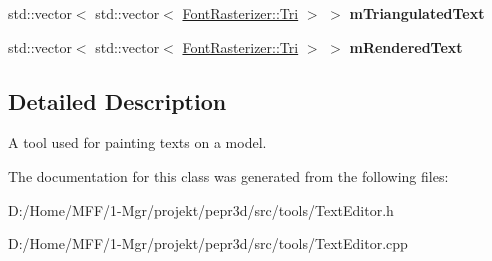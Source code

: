 \begin{DoxyCompactItemize}
\mbox{\label{classpepr3d_1_1_text_editor_a84883561e33acc9e2bdf227823cbe505}} 
std\+::vector$<$ std\+::vector$<$ \mbox{\hyperlink{structpepr3d_1_1_font_rasterizer_1_1_tri}{Font\+Rasterizer\+::\+Tri}} $>$ $>$ {\bfseries m\+Triangulated\+Text}
\item 
\mbox{\label{classpepr3d_1_1_text_editor_a694e71b4b9124a567257054b7af14c59}} 
std\+::vector$<$ std\+::vector$<$ \mbox{\hyperlink{structpepr3d_1_1_font_rasterizer_1_1_tri}{Font\+Rasterizer\+::\+Tri}} $>$ $>$ {\bfseries m\+Rendered\+Text}
\end{DoxyCompactItemize}


\subsection{Detailed Description}
A tool used for painting texts on a model. 

The documentation for this class was generated from the following files\+:\begin{DoxyCompactItemize}
\item 
D\+:/\+Home/\+M\+F\+F/1-\/\+Mgr/projekt/pepr3d/src/tools/Text\+Editor.\+h\item 
D\+:/\+Home/\+M\+F\+F/1-\/\+Mgr/projekt/pepr3d/src/tools/Text\+Editor.\+cpp\end{DoxyCompactItemize}
